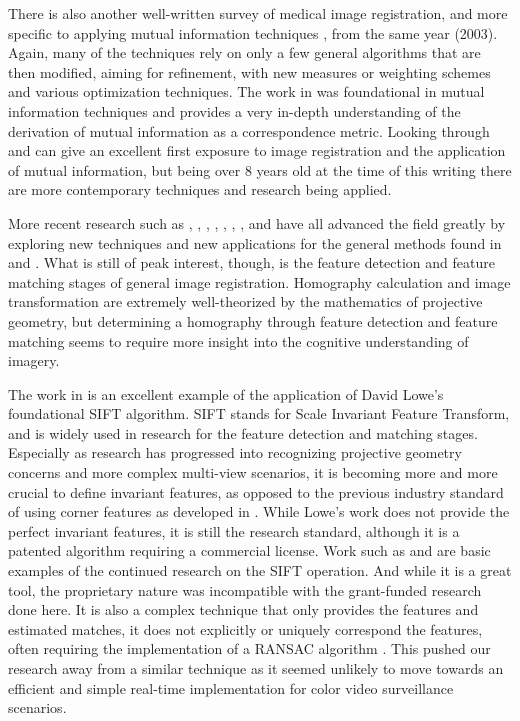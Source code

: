 There is also another well-written survey of medical image registration, and more specific to applying mutual information techniques \cite{Pluim2003}, from the same year (2003). Again, many of the techniques rely on only a few general algorithms that are then modified, aiming for refinement, with new measures or weighting schemes and various optimization techniques. The work in \cite{Viola1997} was foundational in mutual information techniques and provides a very in-depth understanding of the derivation of mutual information as a correspondence metric. Looking through \cite{Zitova2003} and \cite{Pluim2003} can give an excellent first exposure to image registration and the application of mutual information, but being over 8 years old at the time of this writing there are more contemporary techniques and research being applied.
 
 More recent research such as \cite{Walli2009}, \cite{Rav-Acha2005}, \cite{Nilosek2009}, \cite{Kanazawa2004}, \cite{Haenselmann2009}, \cite{Gracias2009}, \cite{Brown2007}, and \cite{Fan2008} have all advanced the field greatly by exploring new techniques and new applications for the general methods found in \cite{Zitova2003} and \cite{Pluim2003}. What is still of peak interest, though, is the feature detection and feature matching stages of general image registration. Homography calculation and image transformation are extremely well-theorized by the mathematics of projective geometry, but determining a homography through feature detection and feature matching seems to require more insight into the cognitive understanding of imagery.
 
  The work in \cite{Brown2003} is an excellent example of the application of David Lowe's foundational SIFT algorithm. SIFT stands for Scale Invariant Feature Transform, and is widely used in research for the feature detection and matching stages. Especially as research has progressed into recognizing projective geometry concerns and more complex multi-view scenarios, it is becoming more and more crucial to define invariant features, as opposed to the previous industry standard of using corner features as developed in \cite{Harris1988}. While Lowe's work does not provide the perfect invariant features, it is still the research standard, although it is a patented algorithm requiring a commercial license. Work such as \cite{Kanazawa2004} and \cite{Brown2007} are basic examples of the continued research on the SIFT operation. And while it is a great tool, the proprietary nature was incompatible with the grant-funded research done here. It is also a complex technique that only provides the features and estimated matches, it does not explicitly or uniquely correspond the features, often requiring the implementation of a RANSAC algorithm \cite{Brown2007}. This pushed our research away from a similar technique as it seemed unlikely to move towards an efficient and simple real-time implementation for color video surveillance scenarios.
  
